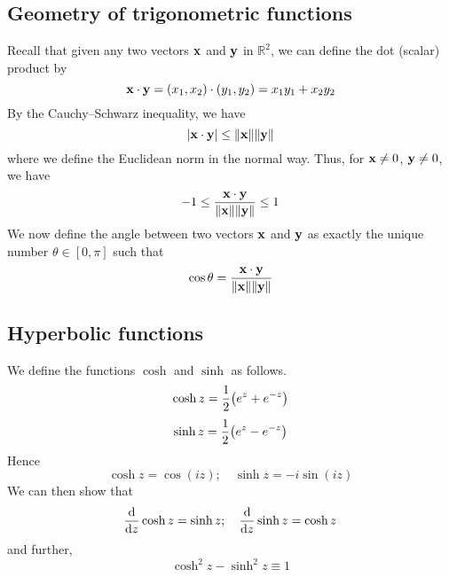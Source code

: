 \subsection{Geometry of trigonometric functions}
Recall that given any two vectors \(\vb x\) and \(\vb y\) in \(\mathbb R^2\), we can define the dot (scalar) product by
\[
	\vb x \cdot \vb y = (x_1, x_2) \cdot (y_1, y_2) = x_1y_1 + x_2y_2
\]
By the Cauchy--Schwarz inequality, we have
\[
	\abs{\vb x \cdot \vb y} \leq \norm{\vb x} \norm{\vb y}
\]
where we define the Euclidean norm in the normal way.
Thus, for \(\vb x \neq 0\), \(\vb y \neq 0\), we have
\[
	-1 \leq \frac{\vb x \cdot \vb y}{\norm{\vb x} \norm{\vb y}} \leq 1
\]
We now define the angle between two vectors \(\vb x\) and \(\vb y\) as exactly the unique number \(\theta \in [0, \pi]\) such that
\[
	\cos\theta = \frac{\vb x \cdot \vb y}{\norm{\vb x} \norm{\vb y}}
\]

\subsection{Hyperbolic functions}
We define the functions \(\cosh\) and \(\sinh\) as follows.
\[
	\cosh z = \frac{1}{2}\qty(e^z + e^{-z})
\]
\[
	\sinh z = \frac{1}{2}\qty(e^z - e^{-z})
\]
Hence
\[
	\cosh z = \cos(iz);\quad \sinh z = -i\sin(iz)
\]
We can then show that
\[
	\dv{z} \cosh z = \sinh z;\quad \dv{z} \sinh z = \cosh z
\]
and further,
\[
	\cosh^2 z - \sinh^2 z \equiv 1
\]

